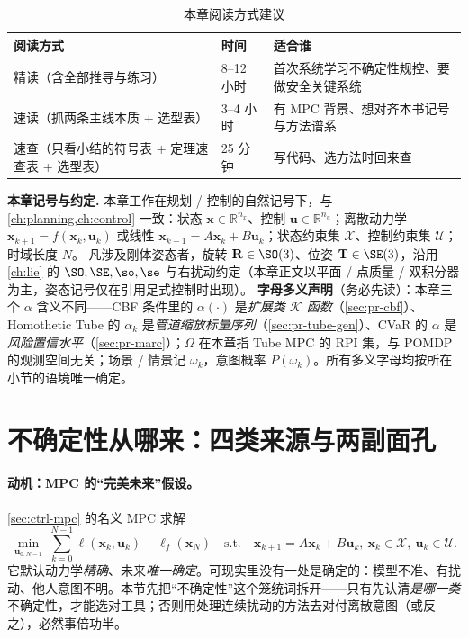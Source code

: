 \begin{table}[H]\centering\small
\caption{本章阅读方式建议}
\label{tab:pr-reading}
\begin{tabular}{lll}
\toprule
阅读方式 & 时间 & 适合谁 \\
\midrule
精读（含全部推导与练习） & 8--12 小时 & 首次系统学习不确定性规控、要做安全关键系统 \\
速读（抓两条主线本质 + 选型表） & 3--4 小时 & 有 MPC 背景、想对齐本书记号与方法谱系 \\
速查（只看小结的符号表 + 定理速查表 + 选型表） & 25 分钟 & 写代码、选方法时回来查 \\
\bottomrule
\end{tabular}
\end{table}

\begin{note}
\textbf{本章记号与约定.}\;
本章工作在规划 / 控制的自然记号下，与 \cref{ch:planning,ch:control} 一致：状态 $\mathbf{x}\in\mathbb{R}^{n_x}$、控制 $\mathbf{u}\in\mathbb{R}^{n_u}$；离散动力学 $\mathbf{x}_{k+1}=f(\mathbf{x}_k,\mathbf{u}_k)$ 或线性 $\mathbf{x}_{k+1}=A\mathbf{x}_k+B\mathbf{u}_k$；状态约束集 $\mathcal{X}$、控制约束集 $\mathcal{U}$；时域长度 $N$。
凡涉及刚体姿态者，旋转 $\mathbf{R}\in\SO(3)$、位姿 $\mathbf{T}\in\SE(3)$，沿用 \cref{ch:lie} 的 $\SO,\SE,\so,\se$ 与右扰动约定（本章正文以平面 / 点质量 / 双积分器为主，姿态记号仅在引用足式控制时出现）。
\textbf{字母多义声明}（务必先读）：本章三个 $\alpha$ 含义不同——CBF 条件里的 $\alpha(\cdot)$ 是\emph{扩展类 $\mathcal{K}$ 函数}（\cref{sec:pr-cbf}）、Homothetic Tube 的 $\alpha_k$ 是\emph{管道缩放标量序列}（\cref{sec:pr-tube-gen}）、CVaR 的 $\alpha$ 是\emph{风险置信水平}（\cref{sec:pr-marc}）；$\Omega$ 在本章指 Tube MPC 的 RPI 集，与 POMDP 的观测空间无关；场景 / 情景记 $\omega_k$，意图概率 $P(\omega_k)$。所有多义字母均按所在小节的语境唯一确定。
\end{note}

\section{不确定性从哪来：四类来源与两副面孔}
\label{sec:pr-uncertainty}

\paragraph{动机：MPC 的“完美未来”假设。}
\cref{sec:ctrl-mpc} 的名义 MPC 求解
\begin{equation}
  \min_{\mathbf{u}_{0:N-1}}\ \sum_{k=0}^{N-1}\ell(\mathbf{x}_k,\mathbf{u}_k)+\ell_f(\mathbf{x}_N)\quad\text{s.t.}\quad \mathbf{x}_{k+1}=A\mathbf{x}_k+B\mathbf{u}_k,\ \mathbf{x}_k\in\mathcal{X},\ \mathbf{u}_k\in\mathcal{U}.
  \label{eq:pr-nominal-mpc}
\end{equation}
它默认动力学\emph{精确}、未来\emph{唯一确定}。可现实里没有一处是确定的：模型不准、有扰动、他人意图不明。本节先把“不确定性”这个笼统词拆开——只有先认清\emph{是哪一类}不确定性，才能选对工具；否则用处理连续扰动的方法去对付离散意图（或反之），必然事倍功半。

